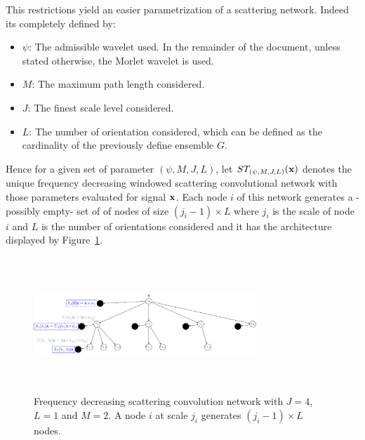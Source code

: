 \documentclass{article}
\begin{document}
    This restrictions yield an easier parametrization of a scattering network. Indeed its completely defined by:\\
      \begin{itemize}
        \item $\psi$: The admissible wavelet used. In the remainder of the document, unless stated otherwise, the Morlet wavelet is used.
        \item $M$: The maximum path length considered.
        \item $J$: The finest scale level considered.
        \item $L$: The number of orientation considered, which can be defined as the cardinality of the previously define ensemble $G$.\\
      \end{itemize}
      
    Hence for a given set of parameter $(\psi, M,J,L)$, let $ST_{(\psi, M,J,L)}({\bf x})$ denotes the unique frequency decreasing windowed scattering convolutional network with those parameters evaluated for signal ${\bf x}$. Each node $i$ of this network generates a -possibly empty- set of of nodes of size $(j_{i}-1) \times L$ where $j_{i}$ is the scale of node $i$ and $L$ is the number of orientations considered and it has the architecture displayed by Figure~\ref{fig:SCN 2}.

      \begin{figure}[h]
	\begin{center}
	  \includegraphics[width=3.3in, height=2in, keepaspectratio]{ST_freqDec_crop.pdf}
	  \caption[Frequency decreasing scattering convolution network.]{\centering  Frequency decreasing scattering convolution network 	with $J=4$, $L=1$ and $M=2$. A node $i$ at scale $j_{i}$ generates $(j_{i}-1) \times L$ nodes. }
	  \label{fig:SCN 2}
	\end{center}	
      \end{figure}


\end{document}

